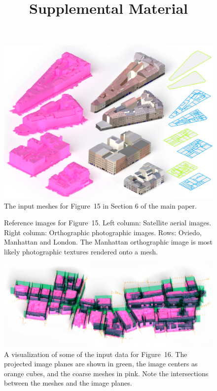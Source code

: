 \documentclass{article}
\date{}
\title{Supplemental Material}
\begin{document}
\graphicspath{{../images/megafacades/}}
\maketitle{}

\begin{figure}[h]
    \centering
    \includegraphics[width=\linewidth]{../images/results/results_pink.png}
    \caption{The input meshes for Figure~15 in Section 6 of the main paper.}
    \label{fig:results}
\end{figure}

\begin{figure}
   \centering
  \def\svgwidth{0.5\linewidth}  
   
  \caption{Reference images for Figure~15. Left column: Satellite aerial images. Right column: Orthographic photographic images. Rows: Oviedo, Manhattan and London. The Manhattan orthographic image is most likely photographic textures rendered onto a mesh.}
  \label{fig:reference}
\end{figure}

\begin{figure}
    \centering
    \includegraphics[width=\linewidth]{../images/results/oxford_sources.png}
    \caption{A visualization of some of the input data for Figure~16. The projected image planes are shown in green, the image centers as orange cubes, and the coarse meshes in pink. Note the intersections between the meshes and the image planes.}
    \label{fig:results}
\end{figure}
\end{document}
